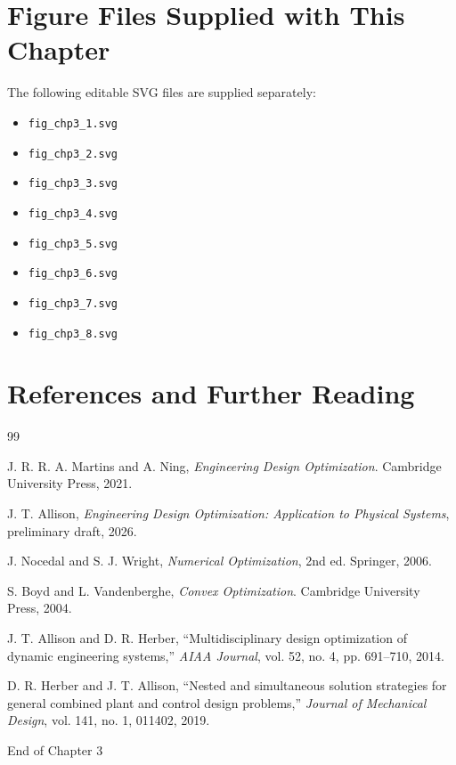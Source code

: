 \documentclass[11pt]{article}
\begin{document}
\section{Figure Files Supplied with This Chapter}

The following editable SVG files are supplied separately:
\begin{itemize}[leftmargin=1.4em]
  \item \texttt{fig\_chp3\_1.svg}
  \item \texttt{fig\_chp3\_2.svg}
  \item \texttt{fig\_chp3\_3.svg}
  \item \texttt{fig\_chp3\_4.svg}
  \item \texttt{fig\_chp3\_5.svg}
  \item \texttt{fig\_chp3\_6.svg}
  \item \texttt{fig\_chp3\_7.svg}
  \item \texttt{fig\_chp3\_8.svg}
\end{itemize}

\section{References and Further Reading}

\begin{thebibliography}{99}

J. R. R. A. Martins and A. Ning, \emph{Engineering Design Optimization}. Cambridge University Press, 2021.

J. T. Allison, \emph{Engineering Design Optimization: Application to Physical Systems}, preliminary draft, 2026.

J. Nocedal and S. J. Wright, \emph{Numerical Optimization}, 2nd ed. Springer, 2006.

S. Boyd and L. Vandenberghe, \emph{Convex Optimization}. Cambridge University Press, 2004.

J. T. Allison and D. R. Herber, ``Multidisciplinary design optimization of dynamic engineering systems,'' \emph{AIAA Journal}, vol. 52, no. 4, pp. 691--710, 2014.

D. R. Herber and J. T. Allison, ``Nested and simultaneous solution strategies for general combined plant and control design problems,'' \emph{Journal of Mechanical Design}, vol. 141, no. 1, 011402, 2019.

\end{thebibliography}

\vfill
\begin{center}
\small\color{CCDgray}
End of Chapter 3
\end{center}
\end{document}
